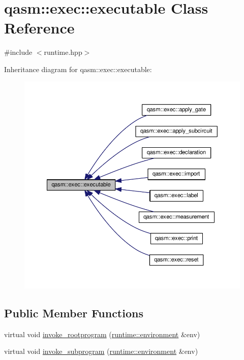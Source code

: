 \hypertarget{classqasm_1_1exec_1_1executable}{}\section{qasm\+:\+:exec\+:\+:executable Class Reference}
\label{classqasm_1_1exec_1_1executable}


{\ttfamily \#include $<$runtime.\+hpp$>$}



Inheritance diagram for qasm\+:\+:exec\+:\+:executable\+:
\nopagebreak
\begin{figure}[H]
\begin{center}
\leavevmode
\includegraphics[width=350pt]{classqasm_1_1exec_1_1executable__inherit__graph}
\end{center}
\end{figure}
\subsection*{Public Member Functions}
\begin{DoxyCompactItemize}
\item 
virtual void \hyperlink{classqasm_1_1exec_1_1executable_ad07f864a889edb0777ebbb1bc1628121}{invoke\+\_\+rootprogram} (\hyperlink{classqasm_1_1runtime_1_1environment}{runtime\+::environment} \&env)
\item 
virtual void \hyperlink{classqasm_1_1exec_1_1executable_ad73a67bcb74196954455b45804944544}{invoke\+\_\+subprogram} (\hyperlink{classqasm_1_1runtime_1_1environment}{runtime\+::environment} \&env)
\end{DoxyCompactItemize}


